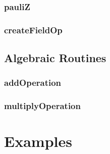 \documentclass[10pt]{book}
\begin{document}
\subsubsection{\textbf{pauliZ}}\label{subsec:pauliz}


\subsubsection{\textbf{createFieldOp}}\label{subsec:createfieldop}



\subsection{Algebraic Routines}
\subsubsection{\textbf{addOperation}}\label{subsec:addop}


\subsubsection{\textbf{multiplyOperation}}\label{subsec:mulop}

 


\clearpage


\section{\qcor Examples}\label{sec:examples}


\clearpage



\end{document}
